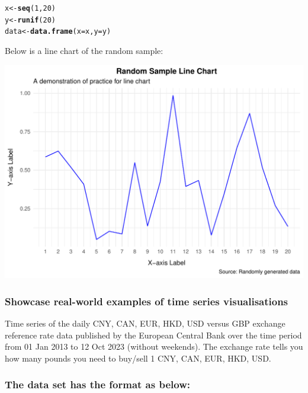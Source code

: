 \documentclass{article}\usepackage[]{graphicx}\usepackage[]{xcolor}
\makeatletter
\def\maxwidth{ %
  \ifdim\Gin@nat@width>\linewidth
    \linewidth
  \else
    \Gin@nat@width
  \fi
}
\newcommand{\hlnum}[1]{\textcolor[rgb]{0.686,0.059,0.569}{#1}}%
\newcommand{\hlstd}[1]{\textcolor[rgb]{0.345,0.345,0.345}{#1}}%
\newcommand{\hlkwb}[1]{\textcolor[rgb]{0.69,0.353,0.396}{#1}}%
\newcommand{\hlkwc}[1]{\textcolor[rgb]{0.333,0.667,0.333}{#1}}%
\newcommand{\hlkwd}[1]{\textcolor[rgb]{0.737,0.353,0.396}{\textbf{#1}}}%
\newenvironment{kframe}{%
 \def\at@end@of@kframe{}%
 \ifinner\ifhmode%
  \def\at@end@of@kframe{\end{minipage}}%
  \begin{minipage}{\columnwidth}%
 \fi\fi%
 \def\FrameCommand##1{\hskip\@totalleftmargin \hskip-\fboxsep
 \colorbox{shadecolor}{##1}\hskip-\fboxsep
     \hskip-\linewidth \hskip-\@totalleftmargin \hskip\columnwidth}%
 \MakeFramed {\advance\hsize-\width
   \@totalleftmargin\z@ \linewidth\hsize
   \@setminipage}}%
 {\par\unskip\endMakeFramed%
 \at@end@of@kframe}
\newenvironment{knitrout}{}{} %
\makeatother
\begin{document}
\begin{knitrout}
\color{fgcolor}\begin{kframe}
\begin{alltt}
\hlstd{x} \hlkwb{<-} \hlkwd{seq}\hlstd{(}\hlnum{1}\hlstd{,} \hlnum{20}\hlstd{)}
\hlstd{y} \hlkwb{<-} \hlkwd{runif}\hlstd{(}\hlnum{20}\hlstd{)}
\hlstd{data} \hlkwb{<-} \hlkwd{data.frame}\hlstd{(}\hlkwc{x} \hlstd{= x,} \hlkwc{y} \hlstd{= y)}
\end{alltt}
\end{kframe}
\end{knitrout}

Below is a line chart of the random sample:

\begin{knitrout}
\color{fgcolor}
\includegraphics[width=\maxwidth]{figure/plot-chunk-1} 
\end{knitrout}


\subsubsection{Showcase real-world examples of time series visualisations}

Time series of the daily CNY, CAN, EUR, HKD, USD versus GBP exchange reference rate data
published by the European Central Bank over the time period from 01 Jan 2013 to 12 Oct 2023 (without weekends). The exchange rate tells you how many pounds you need to buy/sell 1 CNY, CAN, EUR, HKD, USD.

\subsubsection{The data set has the format as below:}
\end{document}
